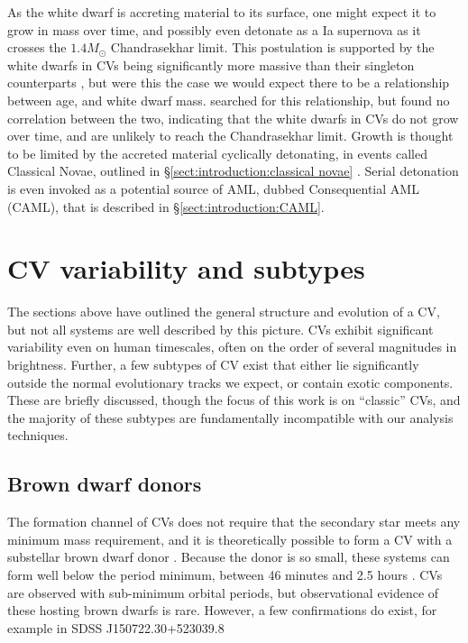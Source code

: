 As the white dwarf is accreting material to its surface, one might expect it to grow in mass over time, and possibly even detonate as a Ia supernova as it crosses the $1.4 M_\odot$ Chandrasekhar limit. This postulation is supported by the white dwarfs in CVs being significantly more massive than their singleton counterparts , but were this the case we would expect there to be a relationship between age, and white dwarf mass. \citet{McAllister2019} searched for this relationship, but found no correlation between the two, indicating that the white dwarfs in CVs do not grow over time, and are unlikely to reach the Chandrasekhar limit. Growth is thought to be limited by the accreted material cyclically detonating, in events called Classical Novae, outlined in \S\ref{sect:introduction:classical novae} \citep{Wijnen2015,sparks2021}. Serial detonation is even invoked as a potential source of AML, dubbed Consequential AML (CAML), that is described in \S\ref{sect:introduction:CAML}.



\section{CV variability and subtypes}
The sections above have outlined the general structure and evolution of a CV, but not all systems are well described by this picture. CVs exhibit significant variability even on human timescales, often on the order of several magnitudes in brightness. Further, a few subtypes of CV exist that either lie significantly outside the normal evolutionary tracks we expect, or contain exotic components. These are briefly discussed, though the focus of this work is on ``classic'' CVs, and the majority of these subtypes are fundamentally incompatible with our analysis techniques.

\subsection{Brown dwarf donors}
\label{sect:introduction:brown dwarf donors}

The formation channel of CVs does not require that the secondary star meets any minimum mass requirement, and it is theoretically possible to form a CV with a substellar brown dwarf donor \citep{politano2002,politano2004}. Because the donor is so small, these systems can form well below the period minimum, between 46 minutes and 2.5 hours \citep{politano2004}. CVs are observed with sub-minimum orbital periods, but observational evidence of these hosting brown dwarfs is rare. However, a few confirmations do exist, for example in SDSS J150722.30+523039.8 \citep{littlefair2007}

